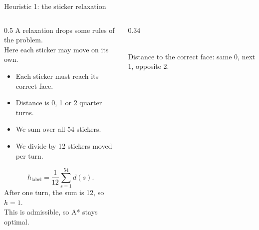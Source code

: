 \documentclass[10pt,aspectratio=169]{beamer}
\begin{document}
\begin{frame}{Heuristic 1: the sticker relaxation}
  \begin{columns}[T,onlytextwidth]
    \hspace*{0.05\textwidth}
    \begin{column}{0.5\textwidth}
      A relaxation drops some rules of the problem. \\
      Here each sticker may move on its own.
      \vspace{0.15cm}
      \begin{itemize}
        \item Each sticker must reach its correct face.
        \item Distance is 0, 1 or 2 quarter turns.
        \item We sum over all 54 stickers.
        \item We divide by 12 stickers moved per turn.
      \end{itemize}
      \[
        h_{\text{label}} = \frac{1}{12}\sum_{s=1}^{54} d(s).
      \]
      After one turn, the sum is 12, so $h = 1$. \\
      This is admissible, so A* stays optimal.
    \end{column}
    \begin{column}{0.34\textwidth}
      \centering
      \vspace{0.8cm}
       \\
      \vspace{0.15cm}
      {\footnotesize Distance to the correct face: same 0, next 1, opposite 2.}
    \end{column}
  \end{columns}
\end{frame}
\end{document}
